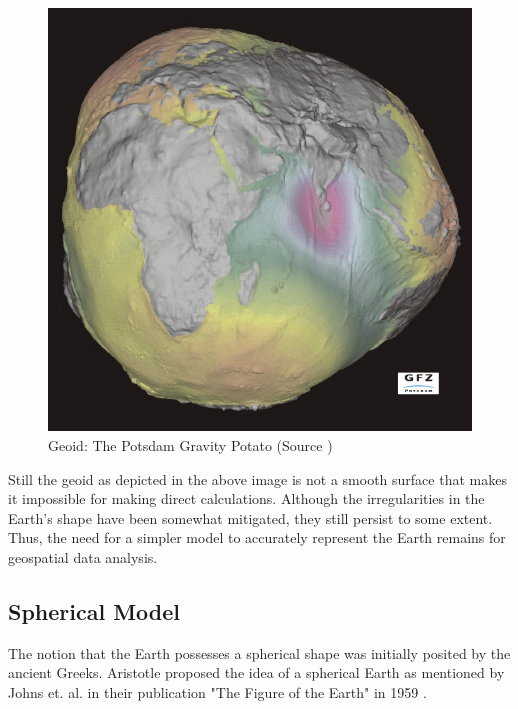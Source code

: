\begin{figure}[h]
    \centering
    \includegraphics[width=0.7\linewidth]{figures/chapter-2/geoid.jpg}
    \caption{Geoid: The Potsdam Gravity Potato (Source \cite{GEOID_IMAGE}) }
    \label{fig:geoid-image}
\end{figure}

Still the geoid as depicted in the above image is not a smooth surface that makes it impossible for making direct calculations. Although the irregularities in the Earth's shape have been somewhat mitigated, they still persist to some extent. Thus, the need for a simpler model to accurately represent the Earth remains for geospatial data analysis.


\subsection{Spherical Model}

The notion that the Earth possesses a spherical shape was initially posited by the ancient Greeks. Aristotle proposed the idea of a spherical Earth as
mentioned by Johns et. al. in their publication "The Figure of the Earth" in 1959 \cite{Johns1959-og}.

